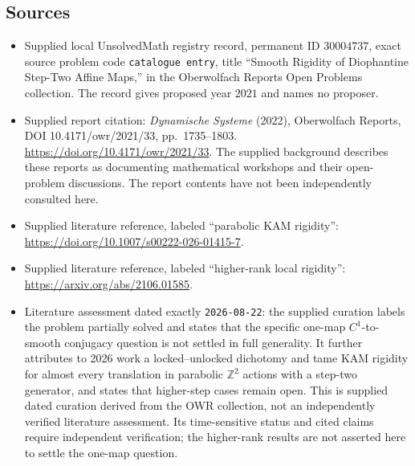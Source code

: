\documentclass[11pt]{article}
\begin{document}
\subsection{Sources}
\begin{itemize}
\item Supplied local UnsolvedMath registry record, permanent ID \(30004737\), exact source problem code \texttt{catalogue entry}, title ``Smooth Rigidity of Diophantine Step-Two Affine Maps,'' in the Oberwolfach Reports Open Problems collection. The record gives proposed year \(2021\) and names no proposer.
\item Supplied report citation: \emph{Dynamische Systeme} (2022), Oberwolfach Reports, DOI 10.4171/owr/2021/33, pp.\ 1735--1803. \url{https://doi.org/10.4171/owr/2021/33}. The supplied background describes these reports as documenting mathematical workshops and their open-problem discussions. The report contents have not been independently consulted here.
\item Supplied literature reference, labeled ``parabolic KAM rigidity'': \url{https://doi.org/10.1007/s00222-026-01415-7}.
\item Supplied literature reference, labeled ``higher-rank local rigidity'': \url{https://arxiv.org/abs/2106.01585}.
\item Literature assessment dated exactly \texttt{2026-08-22}: the supplied curation labels the problem partially solved and states that the specific one-map \(C^{1}\)-to-smooth conjugacy question is not settled in full generality. It further attributes to 2026 work a locked--unlocked dichotomy and tame KAM rigidity for almost every translation in parabolic \(\mathbb{Z}^{2}\) actions with a step-two generator, and states that higher-step cases remain open. This is supplied dated curation derived from the OWR collection, not an independently verified literature assessment. Its time-sensitive status and cited claims require independent verification; the higher-rank results are not asserted here to settle the one-map question.
\end{itemize}
\end{document}
